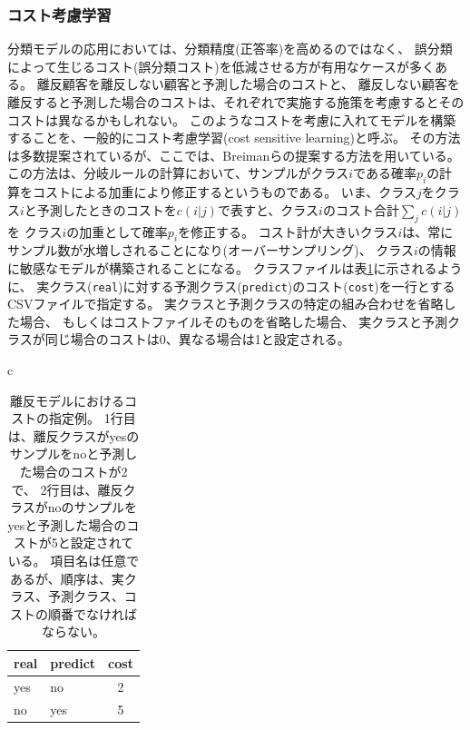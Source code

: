 \subsubsection{コスト考慮学習}
分類モデルの応用においては、分類精度(正答率)を高めるのではなく、
誤分類によって生じるコスト(誤分類コスト)を低減させる方が有用なケースが多くある。
離反顧客を離反しない顧客と予測した場合のコストと、
離反しない顧客を離反すると予測した場合のコストは、それぞれで実施する施策を考慮するとそのコストは異なるかもしれない。
このようなコストを考慮に入れてモデルを構築することを、一般的にコスト考慮学習(cost sensitive learning)と呼ぶ。
その方法は多数提案されているが、ここでは、Breimanらの提案する方法を用いている\cite{Breiman84}。
この方法は、分岐ルールの計算において、サンプルがクラス$i$である確率$p_i$の計算をコストによる加重により修正するというものである。
いま、クラス$j$をクラス$i$と予測したときのコストを$c(i|j)$で表すと、クラス$i$のコスト合計$\sum_{j}c(i|j)$を
クラス$i$の加重として確率$p_i$を修正する。
コスト計が大きいクラス$i$は、常にサンプル数が水増しされることになり(オーバーサンプリング)、
クラス$i$の情報に敏感なモデルが構築されることになる。
クラスファイルは表\ref{tbl:mbonsai_cost}に示されるように、
実クラス(\verb|real|)に対する予測クラス(\verb|predict|)のコスト(\verb|cost|)を一行とするCSVファイルで指定する。
実クラスと予測クラスの特定の組み合わせを省略した場合、
もしくはコストファイルそのものを省略した場合、
実クラスと予測クラスが同じ場合のコストは0、異なる場合は1と設定される。

\begin{table}[htbp]
\begin{center}
\begin{tabular}{c}

\begin{minipage}{0.7\hsize}
\begin{center}
\caption{離反モデルにおけるコストの指定例。
1行目は、離反クラスがyesのサンプルをnoと予測した場合のコストが2で、
2行目は、離反クラスがnoのサンプルをyesと予測した場合のコストが5と設定されている。
項目名は任意であるが、順序は、実クラス、予測クラス、コストの順番でなければならない。
\label{tbl:mbonsai_cost}}
{\small
\begin{tabular}{llc}
\hline
real&predict&cost \\
\hline
yes & no  & 2 \\
no  & yes & 5 \\
\hline
\end{tabular} 
}
\end{center}
\end{minipage}

\end{tabular} 
\end{center}
\end{table} 





